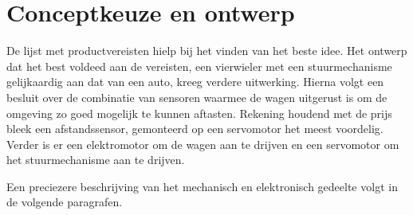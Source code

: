  
\section{Conceptkeuze en ontwerp}
De lijst met productvereisten hielp bij het vinden van het beste idee. Het ontwerp dat het best voldeed aan de vereisten, een vierwieler met een stuurmechanisme gelijkaardig aan dat van een auto, kreeg verdere uitwerking.
Hierna volgt een besluit over de combinatie van sensoren waarmee de wagen uitgerust is om de omgeving zo goed mogelijk te kunnen aftasten. Rekening houdend met de prijs bleek een afstandssensor, gemonteerd op een servomotor het meest voordelig. Verder is er een elektromotor om de wagen aan te drijven en een servomotor om het stuurmechanisme aan te drijven. 

Een preciezere beschrijving van het mechanisch en elektronisch gedeelte volgt in de volgende paragrafen.





